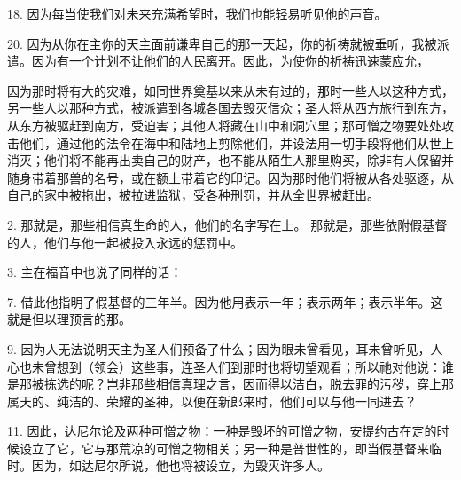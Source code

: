 18.  因为每当使我们对未来充满希望时，我们也能轻易听见他的声音。\par

20.  因为从你在主你的天主面前谦卑自己的那一天起，你的祈祷就被垂听，我被派遣。因为有一个计划不让他们的人民离开。因此，为使你的祈祷迅速蒙应允，\par

  因为那时将有大的灾难，如同世界奠基以来从未有过的，那时一些人以这种方式，另一些人以那种方式，被派遣到各城各国去毁灭信众；圣人将从西方旅行到东方，从东方被驱赶到南方，受迫害；其他人将藏在山中和洞穴里；那可憎之物要处处攻击他们，通过他的法令在海中和陆地上剪除他们，并设法用一切手段将他们从世上消灭；他们将不能再出卖自己的财产，也不能从陌生人那里购买，除非有人保留并随身带着那兽的名号，或在额上带着它的印记。因为那时他们将被从各处驱逐，从自己的家中被拖出，被拉进监狱，受各种刑罚，并从全世界被赶出。\par

2.  那就是，那些相信真生命的人，他们的名字写在上。 那就是，那些依附假基督的人，他们与他一起被投入永远的惩罚中。\par

3.  主在福音中也说了同样的话：\par

7.  借此他指明了假基督的三年半。因为他用表示一年；表示两年；表示半年。这就是但以理预言的那。\par

9. 因为人无法说明天主为圣人们预备了什么；因为眼未曾看见，耳未曾听见，人心也未曾想到（领会）这些事，连圣人们到那时也将切望观看；所以祂对他说：谁是那被拣选的呢？岂非那些相信真理之言，因而得以洁白，脱去罪的污秽，穿上那属天的、纯洁的、荣耀的圣神，以便在新郎来时，他们可以与他一同进去？\par

11. 因此，达尼尔论及两种可憎之物：一种是毁坏的可憎之物，安提约古在定的时候设立了它，它与那荒凉的可憎之物相关；另一种是普世性的，即当假基督来临时。因为，如达尼尔所说，他也将被设立，为毁灭许多人。\par

